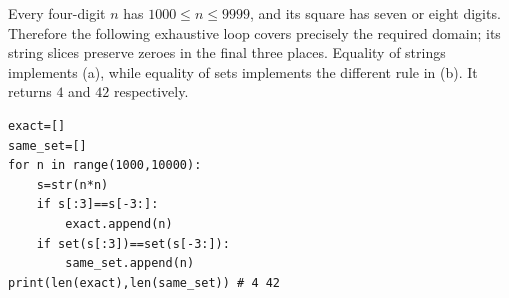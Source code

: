 Every four-digit $n$ has $1000\le n\le9999$, and its square has seven or eight digits. Therefore the following exhaustive loop covers precisely the required domain; its string slices preserve zeroes in the final three places. Equality of strings implements (a), while equality of sets implements the different rule in (b). It returns $\boxed{4}$ and $\boxed{42}$ respectively.\begin{verbatim}
exact=[]
same_set=[]
for n in range(1000,10000):
    s=str(n*n)
    if s[:3]==s[-3:]:
        exact.append(n)
    if set(s[:3])==set(s[-3:]):
        same_set.append(n)
print(len(exact),len(same_set)) # 4 42
\end{verbatim}
